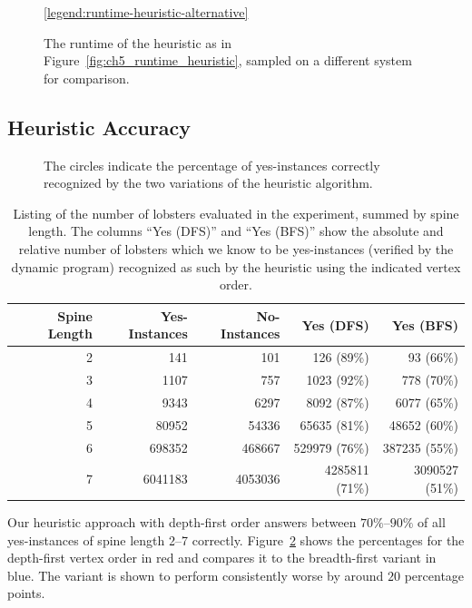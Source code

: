 \begin{figure}
    \centering %
    \scalebox{1}{}
    \scalebox{1}{}
    \ref{legend:runtime-heuristic-alternative}
    \caption{The runtime of the heuristic as in Figure~\ref{fig:ch5_runtime_heuristic}, sampled on a different system for comparison.}
    \label{fig:ch6-runtime-heuristic-alternative}
\end{figure}

\subsection{Heuristic Accuracy}

\begin{figure}
    \centering %
    \scalebox{.8}{}
    \caption{The circles indicate the percentage of yes-instances correctly recognized by the two variations of the heuristic algorithm.}
    \label{fig:ch5_accuracy}
\end{figure}

\begin{table}
\centering
\begin{tabular}{ r|r|r|r|r }
\toprule
Spine Length & Yes-Instances & No-Instances & Yes (DFS) & Yes (BFS) \\
\hline
2	& 141	& 101			& 126	  (89\%) & 93      (66\%) \\
3	& 1107	& 757			& 1023	  (92\%) & 778     (70\%) \\
4	& 9343	& 6297			& 8092	  (87\%) & 6077    (65\%) \\
5	& 80952	& 54336			& 65635	  (81\%) & 48652   (60\%) \\
6	& 698352	& 468667	& 529979  (76\%) & 387235  (55\%) \\
7	& 6041183	& 4053036	& 4285811 (71\%) & 3090527 (51\%) \\
\bottomrule
\end{tabular}
\caption{Listing of the number of lobsters evaluated in the experiment, summed by spine length. The columns ``Yes (DFS)'' and ``Yes (BFS)'' show the absolute and relative number of lobsters which we know to be yes-instances (verified by the dynamic program) recognized as such by the heuristic using the indicated vertex order.}
\label{tbl:heuristic-accuracy}
\end{table}

Our heuristic approach with depth-first order answers between $70\%$--$90\%$ of all yes-instances of spine length 2--7 correctly. Figure~\ref{fig:ch5_accuracy} shows the percentages for the depth-first vertex order in red and compares it to the breadth-first variant in blue. The variant is shown to perform consistently worse by around $20$ percentage points.

